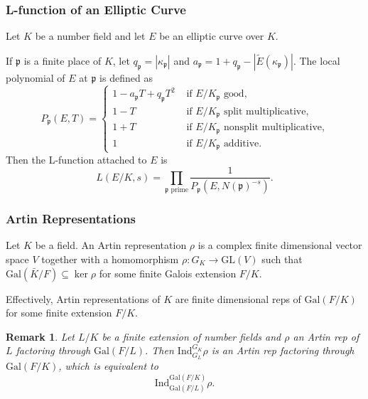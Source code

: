 \documentclass{beamer}
\newcommand{\Gal}{\mathrm{Gal}}
\newcommand{\Ind}{\mathrm{Ind}}
\newcommand{\GL}{\mathrm{GL}}
\newcommand{\pp}{\mathfrak{p}}
\theoremstyle{plain}
\newtheorem{rem}[thm]{Remark}
\begin{document}
\begin{frame}
    \frametitle{L-function of an Elliptic Curve}
    Let $K$ be a number field and let $E$ be an elliptic curve over $K$. \pause
    \begin{definition}
        If $\pp$ is a finite place of $K$, let $q_\pp=|\kappa_\pp|$ and $a_\pp=1+q_\pp-|\tilde{E}(\kappa_\pp)|$. \pause The local polynomial of $E$ at $\pp$ is defined as
        \[
            P_\pp(E,T)=
            \begin{cases}
                1-a_\pp T+q_\pp T^2 &\text{ if $E/K_\pp$ good,}\\ 
                1-T &\text{ if $E/K_\pp$ split multiplicative,}\\ 
                1+T &\text{ if $E/K_\pp$ nonsplit multiplicative,}\\    
                1 &\text{ if $E/K_\pp$ additive.}
            \end{cases}
        \]\pause
    Then the L-function attached to $E$ is 
    $$L(E/K,s)=\prod_{\pp\text{ prime}}\frac{1}{P_\pp(E,N(\pp)^{-s})}.$$
    \end{definition}
\end{frame}

\begin{frame}
    \frametitle{Artin Representations}
    \begin{definition}
        Let $K$ be a field. An Artin representation $\rho$ is a complex finite dimensional vector space $V$ together with a homomorphism $\rho:G_K\to\GL(V)$ such that $\Gal(\bar{K}/F)\subseteq\ker\rho$ for some finite Galois extension $F/K$.
    \end{definition} \pause
    Effectively, Artin representations of $K$ are finite dimensional reps of $\Gal(F/K)$ for some finite extension $F/K$. \pause
    \begin{rem}
        Let $L/K$ be a finite extension of number fields and $\rho$ an Artin rep of $L$ factoring through $\Gal(F/L)$. \pause
        Then $\Ind_{G_L}^{G_K}\rho$ is an Artin rep factoring through $\Gal(F/K)$, which is equivalent to 
        $$\Ind_{\Gal(F/L)}^{\Gal(F/K)}\rho.$$
    \end{rem}
\end{frame}
\end{document}
